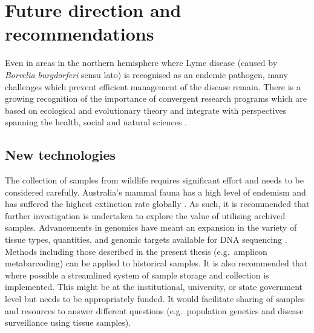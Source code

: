 \documentclass[a4paper, nobind]{templates/ociamthesis}
\begin{document}
\hypertarget{future-direction-and-recommendations}{%
\section{Future direction and recommendations}\label{future-direction-and-recommendations}}

Even in areas in the northern hemisphere where Lyme disease (caused by \emph{Borrelia burgdorferi} sensu lato) is recognised as an endemic pathogen, many challenges which prevent efficient management of the disease remain.
There is a growing recognition of the importance of convergent research programs which are based on ecological and evolutionary theory and integrate with perspectives spanning the health, social and natural sciences \autocite{talbotConvergenceResearchEmerging2021}.

\hypertarget{new-technologies}{%
\subsection{New technologies}\label{new-technologies}}

The collection of samples from wildlife requires significant effort and needs to be considered carefully.
Australia's mammal fauna has a high level of endemism and has suffered the highest extinction rate globally \autocite{flemingGoodBadUgly2016}.
As such, it is recommended that further investigation is undertaken to explore the value of utilising archived samples.
Advancements in genomics have meant an expansion in the variety of tissue types, quantities, and genomic targets available for DNA sequencing \autocite{fitakExpectationsChallengesWildlife2019}.
Methods including those described in the present thesis (e.g.~amplicon metabarcoding) can be applied to historical samples.
It is also recommended that where possible a streamlined system of sample storage and collection is implemented.
This might be at the institutional, university, or state government level but needs to be appropriately funded.
It would facilitate sharing of samples and resources to answer different questions (e.g.~population genetics and disease surveillance using tissue samples).
\end{document}
